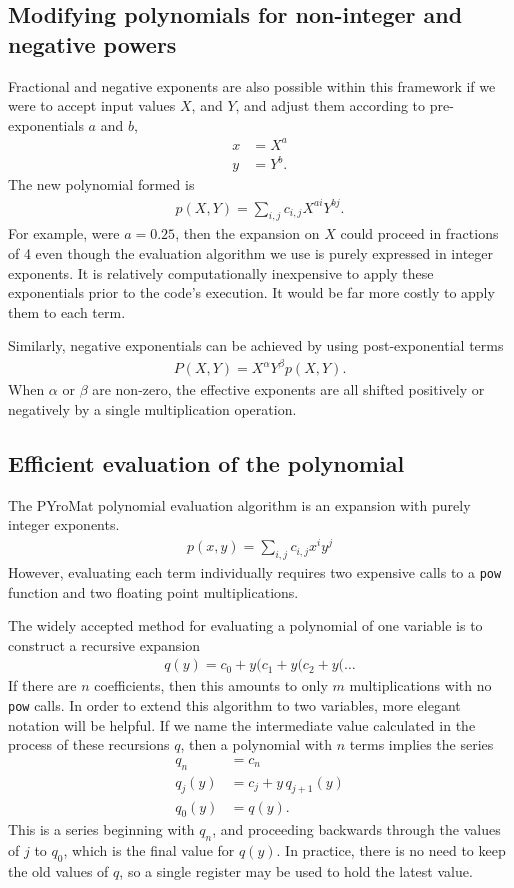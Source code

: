 \documentclass[letterpaper,11pt]{article}
\begin{document}
\subsection{Modifying polynomials for non-integer and negative powers}
Fractional and negative exponents are also possible within this framework if we were to accept input values $X$, and $Y$, and adjust them according to pre-exponentials $a$ and $b$,
\begin{align}
x &= X^a\\
y &= Y^b.
\end{align}
The new polynomial formed is
\begin{align}
p(X,Y) = \sum_{i,j} c_{i,j} X^{ai} Y^{bj}.
\end{align}
For example, were $a=0.25$, then the expansion on $X$ could proceed in fractions of 4 even though the evaluation algorithm we use is purely expressed in integer exponents.  It is relatively computationally inexpensive to apply these exponentials prior to the code's execution.  It would be far more costly to apply them to each term.

Similarly, negative exponentials can be achieved by using post-exponential terms
\begin{align}
P(X,Y) = X^\alpha Y^\beta p(X,Y).
\end{align}
When $\alpha$ or $\beta$ are non-zero, the effective exponents are all shifted positively or negatively by a single multiplication operation.

\subsection{Efficient evaluation of the polynomial}

The PYroMat polynomial evaluation algorithm is an expansion with purely integer exponents.
\begin{align}
p(x,y) = \sum_{i,j} c_{i,j} x^i y^j
\end{align}
However, evaluating each term individually requires two expensive calls to a \verb|pow| function and two floating point multiplications.

The widely accepted method for evaluating a polynomial of one variable is to construct a recursive expansion
\begin{align}
q(y) = c_0 + y ( c_1 + y ( c_2 + y ( \ldots
\end{align}
If there are $n$ coefficients, then this amounts to only $m$ multiplications with no \verb|pow| calls.  In order to extend this algorithm to two variables, more elegant notation will be helpful.  If we name the intermediate value calculated in the process of these recursions $q$, then a polynomial with $n$ terms implies the series
\begin{align}
q_n &= c_n\\
q_j(y) &= c_j + y\,q_{j+1}(y)\\
q_0(y) &= q(y).
\end{align}
This is a series beginning with $q_n$, and proceeding backwards through the values of $j$ to $q_0$, which is the final value for $q(y)$.  In practice, there is no need to keep the old values of $q$, so a single register may be used to hold the latest value.
\end{document}
